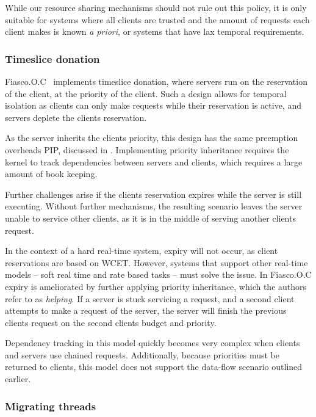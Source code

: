 While our resource sharing mechanisms should not rule out this policy, it is only suitable for systems where all clients are trusted and the amount of requests each client makes is known \emph{a priori}, or systems that have lax temporal requirements.

\subsubsection{Timeslice donation}

Fiasco.O.C~\citep{Steinberg_BK_2010} implements timeslice donation, where servers run on the reservation of the client, at the priority of the client.
Such a design allows for temporal isolation as clients can only make requests while their reservation is active, and servers deplete the clients reservation.

As the server inherits the clients priority, this design has the same preemption overheads \gls{PIP}, discussed in .
Implementing priority inheritance requires the kernel to track dependencies between servers and clients, which requires a large amount of book keeping.

Further challenges arise if the clients reservation expires while the server is still executing.
Without further mechanisms, the resulting scenario leaves the server unable to service other clients, as it is in the middle of serving another clients request.

In the context of a hard real-time system, expiry will not occur, as client reservations are based on \gls{WCET}.
However, systems that support other real-time models -- soft real time and rate based tasks --  must solve the issue.
In Fiasco.O.C expiry is ameliorated by further applying priority inheritance, which the authors refer to as \emph{helping}.
If a server is stuck servicing a request, and a second client attempts to make a request of the server, the server will finish the previous clients request on the second clients budget and priority.

Dependency tracking in this model quickly becomes very complex when clients and servers use chained requests.
Additionally, because priorities must be returned to clients, this model does not support the data-flow scenario outlined earlier.

\subsubsection{Migrating threads}

